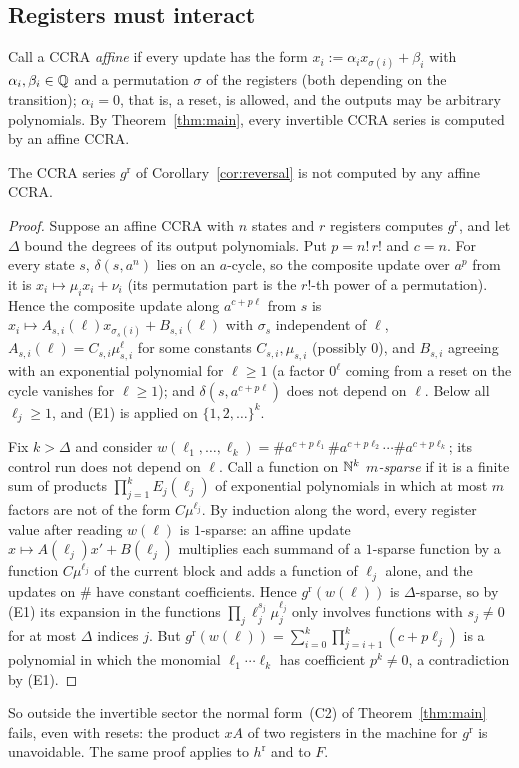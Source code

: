 \subsection{Registers must interact}
Call a CCRA \emph{affine} if every update has the form $x_i:=\alpha_ix_{\sigma(i)}+\beta_i$ with $\alpha_i,\beta_i\in\mathbb{Q}$ and a permutation $\sigma$ of the registers (both depending on the transition); $\alpha_i=0$, that is, a reset, is allowed, and the outputs may be arbitrary polynomials. By Theorem~\ref{thm:main}, every invertible CCRA series is computed by an affine CCRA.

\begin{proposition}\label{prop:interact}
The CCRA series $g^{\mathrm r}$ of Corollary~\ref{cor:reversal} is not computed by any affine CCRA.
\end{proposition}
\begin{proof}
Suppose an affine CCRA with $n$ states and $r$ registers computes $g^{\mathrm r}$, and let $\Delta$ bound the degrees of its output polynomials. Put $p=n!\,r!$ and $c=n$. For every state $s$, $\delta(s,a^n)$ lies on an $a$-cycle, so the composite update over $a^p$ from it is $x_i\mapsto\mu_ix_i+\nu_i$ (its permutation part is the $r!$-th power of a permutation). Hence the composite update along $a^{c+p\ell}$ from $s$ is $x_i\mapsto A_{s,i}(\ell)x_{\sigma_s(i)}+B_{s,i}(\ell)$ with $\sigma_s$ independent of $\ell$, $A_{s,i}(\ell)=C_{s,i}\mu_{s,i}^\ell$ for some constants $C_{s,i},\mu_{s,i}$ (possibly $0$), and $B_{s,i}$ agreeing with an exponential polynomial for $\ell\ge1$ (a factor $0^\ell$ coming from a reset on the cycle vanishes for $\ell\ge1$); and $\delta(s,a^{c+p\ell})$ does not depend on $\ell$. Below all $\ell_j\ge1$, and (E1) is applied on $\{1,2,\ldots\}^k$.

Fix $k>\Delta$ and consider $w(\ell_1,\ldots,\ell_k)=\#a^{c+p\ell_1}\#a^{c+p\ell_2}\cdots\#a^{c+p\ell_k}$; its control run does not depend on $\ell$. Call a function on $\mathbb{N}^k$ \emph{$m$-sparse} if it is a finite sum of products $\prod_{j=1}^kE_j(\ell_j)$ of exponential polynomials in which at most $m$ factors are not of the form $C\mu^{\ell_j}$. By induction along the word, every register value after reading $w(\ell)$ is $1$-sparse: an affine update $x\mapsto A(\ell_j)x'+B(\ell_j)$ multiplies each summand of a $1$-sparse function by a function $C\mu^{\ell_j}$ of the current block and adds a function of $\ell_j$ alone, and the updates on $\#$ have constant coefficients. Hence $g^{\mathrm r}(w(\ell))$ is $\Delta$-sparse, so by (E1) its expansion in the functions $\prod_j\ell_j^{s_j}\mu_j^{\ell_j}$ only involves functions with $s_j\ne0$ for at most $\Delta$ indices $j$. But $g^{\mathrm r}(w(\ell))=\sum_{i=0}^k\prod_{j=i+1}^k(c+p\ell_j)$ is a polynomial in which the monomial $\ell_1\cdots\ell_k$ has coefficient $p^k\ne0$, a contradiction by (E1).
\end{proof}
So outside the invertible sector the normal form~(C2) of Theorem~\ref{thm:main} fails, even with resets: the product $xA$ of two registers in the machine for $g^{\mathrm r}$ is unavoidable. The same proof applies to $h^{\mathrm r}$ and to $F$.

